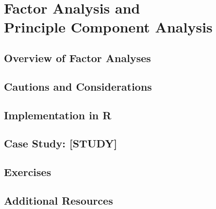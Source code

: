 
\chapter{Factor Analysis and\\ Principle Component Analysis}

\section{Overview of Factor Analyses}

\section{Cautions and Considerations}

\section{Implementation in R}

\section{Case Study: [STUDY]}

\section{Exercises}

\section{Additional Resources}
